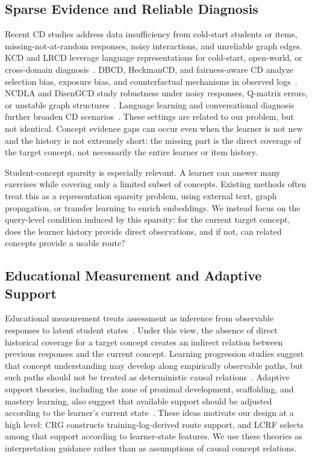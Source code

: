 \documentclass[conference]{IEEEtran}
\begin{document}
\subsection{Sparse Evidence and Reliable Diagnosis}
Recent CD studies address data insufficiency from cold-start students or items, missing-not-at-random responses, noisy interactions, and unreliable graph edges. KCD and LRCD leverage language representations for cold-start, open-world, or cross-domain diagnosis~\cite{dong2025kcd,liu2025lrcd}. DBCD, HeckmanCD, and fairness-aware CD analyze selection bias, exposure bias, and counterfactual mechanisms in observed logs~\cite{yang2026dbcd,han2024heckmancd,zhang2024faircd,zhang2024causalcdf}. NCDLA and DisenGCD study robustness under noisy responses, Q-matrix errors, or unstable graph structures~\cite{zhang2026ncdla,yang2024disengcd}. Language learning and conversational diagnosis further broaden CD scenarios~\cite{ma2024languagecd,yao2026parld}. These settings are related to our problem, but not identical. Concept evidence gaps can occur even when the learner is not new and the history is not extremely short: the missing part is the direct coverage of the target concept, not necessarily the entire learner or item history.

Student-concept sparsity is especially relevant. A learner can answer many exercises while covering only a limited subset of concepts. Existing methods often treat this as a representation sparsity problem, using external text, graph propagation, or transfer learning to enrich embeddings. We instead focus on the query-level condition induced by this sparsity: for the current target concept, does the learner history provide direct observations, and if not, can related concepts provide a usable route?

\subsection{Educational Measurement and Adaptive Support}
Educational measurement treats assessment as inference from observable responses to latent student states~\cite{pellegrino2001knowing,mislevy2003structure}. Under this view, the absence of direct historical coverage for a target concept creates an indirect relation between previous responses and the current concept. Learning progression studies suggest that concept understanding may develop along empirically observable paths, but such paths should not be treated as deterministic causal relations~\cite{corcoran2009learning}. Adaptive support theories, including the zone of proximal development, scaffolding, and mastery learning, also suggest that available support should be adjusted according to the learner's current state~\cite{vygotsky1978mind,wood1976tutoring,bloom1968learning}. These ideas motivate our design at a high level: CRG constructs training-log-derived route support, and LCRF selects among that support according to learner-state features. We use these theories as interpretation guidance rather than as assumptions of causal concept relations.
\end{document}
